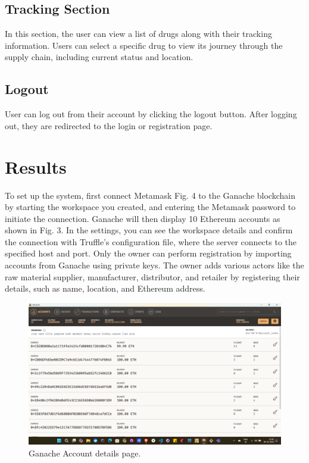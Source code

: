 \documentclass[conference]{IEEEtran}
\begin{document}
\subsection{Tracking Section}
In this section, the user can view a list of drugs along with their tracking information. Users can select a specific drug to view its journey through the supply chain, including current status and location.

\subsection{Logout }
User can log out from their account by clicking the logout button. After logging out, they are redirected to the login or registration page.



\section{Results}
To set up the system, first connect Metamask Fig. 4 to the Ganache blockchain by starting the workspace you created, and entering the Metamask password to initiate the connection. Ganache will then display 10 Ethereum accounts as shown in Fig. 3. In the settings, you can see the workspace details and confirm the connection with Truffle's configuration file, where the server connects to the specified host and port. Only the owner can perform registration by importing accounts from Ganache using private keys. The owner adds various actors like the raw material supplier, manufacturer, distributor, and retailer by registering their details, such as name, location, and Ethereum address.  


\begin{figure}[h]
    \centering
    \includegraphics[width=1\linewidth]{assets/Fig 5.5.png}
    \caption{Ganache Account details page.}
    \label{fig3}
\end{figure}
\end{document}
